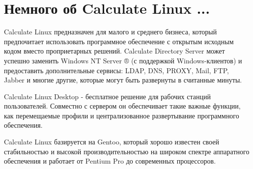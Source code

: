 \newpage
\section{Немного об Calculate Linux ...}

Calculate Linux предназначен для малого и среднего бизнеса, который предпочитает использовать программное обеспечение с открытым исходным кодом вместо проприетарных решений. Calculate Directory Server может успешно заменить Windows NT Server ® (с поддержкой Windows-клиентов) и предоставить дополнительные сервисы: LDAP, DNS, PROXY, Mail, FTP, Jabber и многие другие, которые могут быть развернуты в считанные минуты.

Calculate Linux Desktop - бесплатное решение для рабочих станций пользователей. Совместно с сервером он обеспечивает такие важные функции, как перемещаемые профили и централизованное развертывание программного обеспечения.

Calculate Linux базируется на Gentoo, который хорошо известен своей стабильностью и высокой производительностью на широком спектре аппаратного обеспечения и работает от Pentium Pro до современных процессоров.